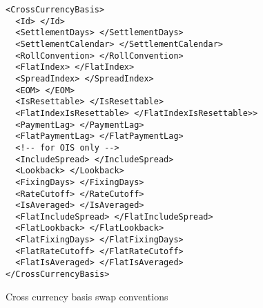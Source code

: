 \begin{listing}[H]
\begin{verbatim}
<CrossCurrencyBasis>
  <Id> </Id>
  <SettlementDays> </SettlementDays>
  <SettlementCalendar> </SettlementCalendar>
  <RollConvention> </RollConvention>
  <FlatIndex> </FlatIndex>
  <SpreadIndex> </SpreadIndex>
  <EOM> </EOM>
  <IsResettable> </IsResettable>
  <FlatIndexIsResettable> </FlatIndexIsResettable>>
  <PaymentLag> </PaymentLag>
  <FlatPaymentLag> </FlatPaymentLag>
  <!-- for OIS only -->
  <IncludeSpread> </IncludeSpread>
  <Lookback> </Lookback>
  <FixingDays> </FixingDays>
  <RateCutoff> </RateCutoff>
  <IsAveraged> </IsAveraged>
  <FlatIncludeSpread> </FlatIncludeSpread>
  <FlatLookback> </FlatLookback>
  <FlatFixingDays> </FlatFixingDays>
  <FlatRateCutoff> </FlatRateCutoff>
  <FlatIsAveraged> </FlatIsAveraged>
</CrossCurrencyBasis>
\end{verbatim}
\caption{Cross currency basis swap conventions}
\label{lst:xccy_basis_conventions}
\end{listing}


